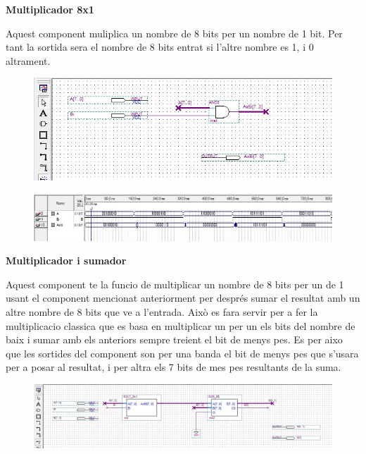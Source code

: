 \documentclass[12pt, a4papre]{article}
\begin{document}
	\textbf{\large{Multiplicador 8x1}}
	
	Aquest component muliplica un nombre de 8 bits per  un nombre de 1 bit. Per tant la sortida sera el nombre de 8 bits entrat si l'altre nombre es 1, i 0 altrament.
	
	\begin{figure}[H]
		\begin{center}
		\includegraphics[width=150mm]{MULT8x1.jpeg}
		\end{center}
	\end{figure}
	
	\begin{center}
	
	\begin{figure}[H]
		\begin{center}
		\includegraphics[width=150mm]{MULT8x1simul.jpeg}
		\end{center}
	\end{figure}
	
	\end{center}
	
	\textbf{\large{Multiplicador i sumador}}
	
	Aquest component te la funcio de multiplicar un nombre de 8 bits per un de 1 usant el component mencionat anteriorment per després sumar el resultat amb un altre nombre de 8 bits que ve a l'entrada. Això es fara servir per a fer la multiplicacio classica que es basa en multiplicar un per un els bits del nombre de baix i sumar amb els anteriors sempre treient el bit de menys pes. Es per aixo que les sortides del component son per una banda el bit de menys pes que s'usara per a posar al resultat, i per altra els 7 bits de mes pes resultants de la suma. 
	
	\begin{center}
	\begin{figure}[H]
		\begin{center}
		\includegraphics[width=150mm]{MULT_+SUM.jpeg}
		\end{center}
	\end{figure}
	
	\end{center}
	
\end{document}
